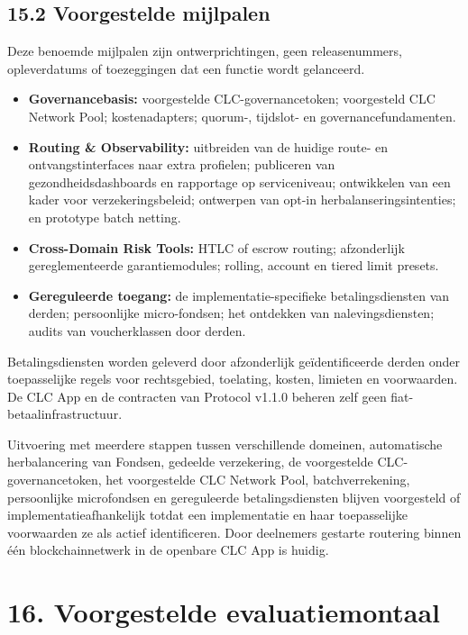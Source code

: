 \documentclass[11pt]{article}
\begin{document}
\subsection*{15.2 Voorgestelde mijlpalen}

Deze benoemde mijlpalen zijn ontwerprichtingen, geen releasenummers, opleverdatums of toezeggingen dat een functie wordt gelanceerd.

\begin{itemize}[leftmargin=*]
\item \textbf{Governancebasis:} voorgestelde CLC-governancetoken; voorgesteld CLC Network Pool; kostenadapters; quorum-, tijdslot- en governancefundamenten.
\item \textbf{Routing \& Observability:} uitbreiden van de huidige route- en ontvangstinterfaces naar extra profielen; publiceren van gezondheidsdashboards en rapportage op serviceniveau; ontwikkelen van een kader voor verzekeringsbeleid; ontwerpen van opt-in herbalanseringsintenties; en prototype batch netting.
\item \textbf{Cross-Domain Risk Tools:} HTLC of escrow routing; afzonderlijk gereglementeerde garantiemodules; rolling, account en tiered limit presets.
\item \textbf{Gereguleerde toegang:} de implementatie-specifieke betalingsdiensten van derden; persoonlijke micro-fondsen; het ontdekken van nalevingsdiensten; audits van voucherklassen door derden.
\end{itemize}
Betalingsdiensten worden geleverd door afzonderlijk geïdentificeerde derden onder toepasselijke regels voor rechtsgebied, toelating, kosten, limieten en voorwaarden. De CLC App en de contracten van Protocol v1.1.0 beheren zelf geen fiat-betaalinfrastructuur.

Uitvoering met meerdere stappen tussen verschillende domeinen, automatische herbalancering van Fondsen, gedeelde verzekering, de voorgestelde CLC-governancetoken, het voorgestelde CLC Network Pool, batchverrekening, persoonlijke microfondsen en gereguleerde betalingsdiensten blijven voorgesteld of implementatieafhankelijk totdat een implementatie en haar toepasselijke voorwaarden ze als actief identificeren. Door deelnemers gestarte routering binnen één blockchainnetwerk in de openbare CLC App is huidig.


\section*{16. Voorgestelde evaluatiemontaal}
\end{document}
